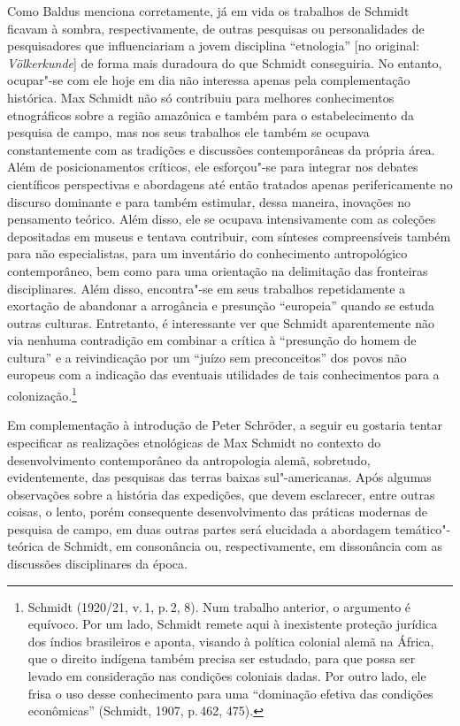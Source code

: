 Como Baldus menciona corretamente, já em vida os trabalhos de Schmidt
ficavam à sombra, respectivamente, de outras pesquisas ou personalidades
de pesquisadores que influenciariam a jovem disciplina ``etnologia''
{[}no original: \textit{Völkerkunde}{]} de forma mais duradoura do que
Schmidt conseguiria. No entanto, ocupar"-se com ele hoje em dia não
interessa apenas pela complementação histórica. Max Schmidt não só
contribuiu para melhores conhecimentos etnográficos sobre a região
amazônica e também para o estabelecimento da pesquisa de campo, mas nos
seus trabalhos ele também se ocupava constantemente com as tradições e
discussões contemporâneas da própria área. Além de posicionamentos
críticos, ele esforçou"-se para integrar nos debates científicos
perspectivas e abordagens até então tratados apenas perifericamente no
discurso dominante e para também estimular, dessa maneira, inovações no
pensamento teórico. Além disso, ele se ocupava intensivamente com as
coleções depositadas em museus e tentava contribuir, com sínteses
compreensíveis também para não especialistas, para um inventário do
conhecimento antropológico contemporâneo, bem como para uma orientação
na delimitação das fronteiras disciplinares. Além disso, encontra"-se em
seus trabalhos repetidamente a exortação de abandonar a arrogância e
presunção ``europeia'' quando se estuda outras culturas. Entretanto, é
interessante ver que Schmidt aparentemente não via nenhuma contradição
em combinar a crítica à ``presunção do homem de cultura'' e a
reivindicação por um ``juízo sem preconceitos'' dos povos não europeus
com a indicação das eventuais utilidades de tais conhecimentos para a
colonização.\footnote{Schmidt (1920/21, v.\,1, p.\,2, 8). Num trabalho
  anterior, o argumento é equívoco. Por um lado, Schmidt remete aqui à
  inexistente proteção jurídica dos índios brasileiros e aponta,
  visando à política colonial alemã na África, que o direito indígena
  também precisa ser estudado, para que possa ser levado em consideração
  nas condições coloniais dadas. Por outro lado, ele frisa o uso desse
  conhecimento para uma ``dominação efetiva das condições econômicas''
  (Schmidt, 1907, p.\,462, 475).}

Em complementação à introdução de Peter Schröder, a seguir eu gostaria
tentar especificar as realizações etnológicas de Max Schmidt no contexto
do desenvolvimento contemporâneo da antropologia alemã, sobretudo,
evidentemente, das pesquisas das terras baixas sul"-americanas. Após
algumas observações sobre a história das expedições, que devem
esclarecer, entre outras coisas, o lento, porém consequente
desenvolvimento das práticas modernas de pesquisa de campo, em duas
outras partes será elucidada a abordagem temático"-teórica de Schmidt, em
consonância ou, respectivamente, em dissonância com as discussões
disciplinares da época.

